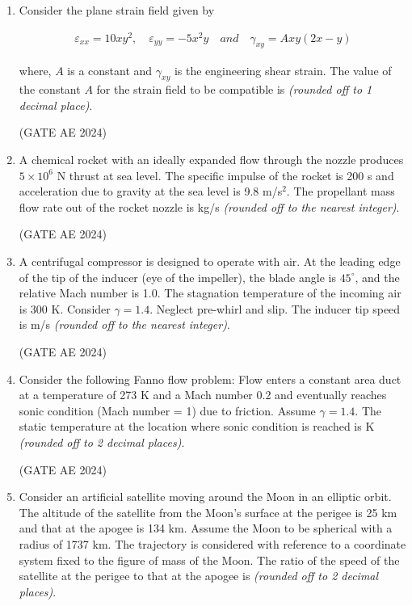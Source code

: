 \documentclass[journal,12pt,onecolumn]{IEEEtran}
\theoremstyle{remark}
\begin{document}
\begin{flushleft}
\begin{enumerate}
\item Consider the plane strain field given by  

\begin{align*}
    \varepsilon_{xx} = 10xy^2, \quad \varepsilon_{yy} = -5x^2y \quad and \quad \gamma_{xy} = Axy(2x-y)
\end{align*}

where, $A$ is a constant and $\gamma_{xy}$ is the engineering shear strain. The value of the constant $A$ for the strain field to be compatible is \underline{\hspace{3cm}} \textit{(rounded off to 1 decimal place)}.

\hfill (GATE AE 2024)

\item A chemical rocket with an ideally expanded flow through the nozzle produces $5\times 10^6$ N thrust at sea level. The specific impulse of the rocket is 200 s and acceleration due to gravity at the sea level is 9.8 m/s$^2$. The propellant mass flow rate out of the rocket nozzle is \underline{\hspace{3cm}} kg/s \textit{(rounded off to the nearest integer)}.

\hfill (GATE AE 2024)

\item A centrifugal compressor is designed to operate with air. At the leading edge of the tip of the inducer (eye of the impeller), the blade angle is $45^\circ$, and the relative Mach number is 1.0. The stagnation temperature of the incoming air is 300 K. Consider $\gamma = 1.4$. Neglect pre-whirl and slip. The inducer tip speed is \underline{\hspace{3cm}} m/s \textit{(rounded off to the nearest integer)}.

\hfill (GATE AE 2024)

\item Consider the following Fanno flow problem: Flow enters a constant area duct at a temperature of 273 K and a Mach number 0.2 and eventually reaches sonic condition (Mach number = 1) due to friction. Assume $\gamma = 1.4$. The static temperature at the location where sonic condition is reached is \underline{\hspace{3cm}} K \textit{(rounded off to 2 decimal places)}.

\hfill (GATE AE 2024)

\item Consider an artificial satellite moving around the Moon in an elliptic orbit. The altitude of the satellite from the Moon's surface at the perigee is 25 km and that at the apogee is 134 km. Assume the Moon to be spherical with a radius of 1737 km. The trajectory is considered with reference to a coordinate system fixed to the figure of mass of the Moon. The ratio of the speed of the satellite at the perigee to that at the apogee is \underline{\hspace{3cm}} \textit{(rounded off to 2 decimal places)}.


\end{enumerate}
\end{flushleft}
\end{document}
